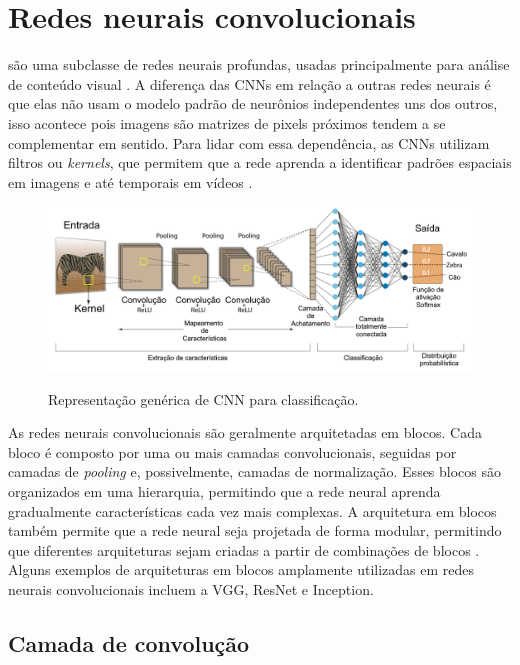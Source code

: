 \section{Redes neurais convolucionais}

 são uma subclasse de redes neurais profundas, usadas principalmente para análise de conteúdo visual \cite{valueva2020application}. 
A diferença das CNNs em relação a outras redes neurais é que elas não usam o modelo padrão de neurônios independentes uns dos outros, isso acontece pois imagens são matrizes de pixels próximos tendem a se complementar em sentido. 
Para lidar com essa dependência, as CNNs utilizam filtros ou \textit{kernels}, que permitem que a rede aprenda a identificar padrões espaciais em imagens e até temporais em vídeos \cite{lecun1998gradient}.

\begin{figure}[htb]
    \centering
    \caption{Representação genérica de CNN para classificação.}
    \includegraphics[width=1.0\linewidth]{TCC UFG/images/cnn_example.png}
    \label{fig:genconv}
\end{figure}

As redes neurais convolucionais são geralmente arquitetadas em blocos. 
Cada bloco é composto por uma ou mais camadas convolucionais, seguidas por camadas de \textit{pooling} e, possivelmente, camadas de normalização. 
Esses blocos são organizados em uma hierarquia, permitindo que a rede neural aprenda gradualmente características cada vez mais complexas. 
A arquitetura em blocos também permite que a rede neural seja projetada de forma modular, permitindo que diferentes arquiteturas sejam criadas a partir de combinações de blocos \cite{simonyan2014very}. 
Alguns exemplos de arquiteturas em blocos amplamente utilizadas em redes neurais convolucionais incluem a VGG, ResNet e Inception.


\subsection{Camada de convolução}


